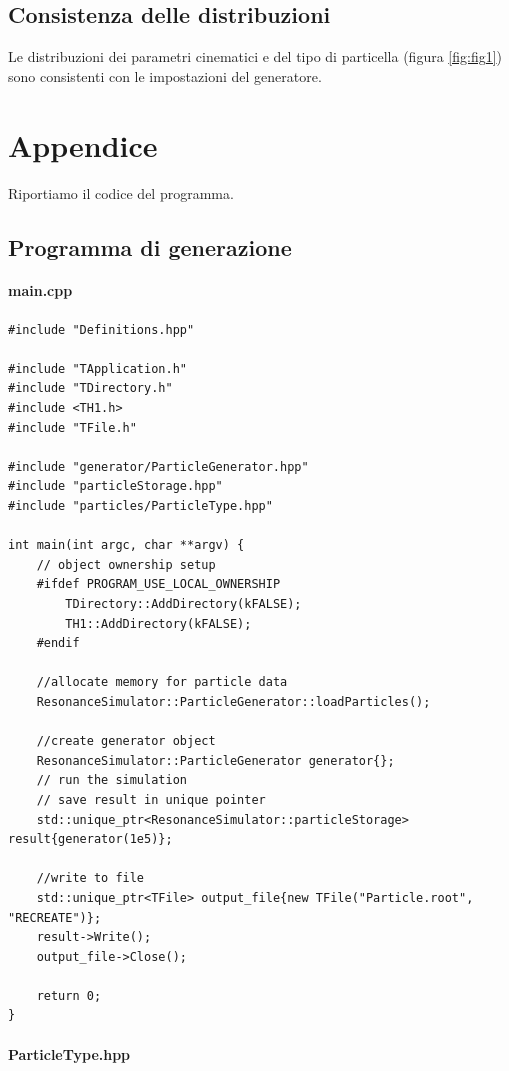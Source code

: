 \documentclass[12pt, a4paper]{article}
\begin{document}
\subsection{Consistenza delle distribuzioni}
Le distribuzioni dei parametri cinematici e del tipo di particella (figura \ref{fig:fig1}) sono consistenti con le impostazioni del generatore.


\section{Appendice}

Riportiamo il codice del programma.

\subsection{Programma di generazione}

\paragraph{main.cpp}

\begin{verbatim}
#include "Definitions.hpp"

#include "TApplication.h"
#include "TDirectory.h"
#include <TH1.h>
#include "TFile.h"

#include "generator/ParticleGenerator.hpp"
#include "particleStorage.hpp"
#include "particles/ParticleType.hpp"

int main(int argc, char **argv) {
    // object ownership setup
    #ifdef PROGRAM_USE_LOCAL_OWNERSHIP
        TDirectory::AddDirectory(kFALSE);
        TH1::AddDirectory(kFALSE);
    #endif

    //allocate memory for particle data
    ResonanceSimulator::ParticleGenerator::loadParticles();

    //create generator object
    ResonanceSimulator::ParticleGenerator generator{};
    // run the simulation
    // save result in unique pointer
    std::unique_ptr<ResonanceSimulator::particleStorage> result{generator(1e5)};

    //write to file
    std::unique_ptr<TFile> output_file{new TFile("Particle.root", "RECREATE")};
    result->Write();
    output_file->Close();

    return 0;
}
\end{verbatim}

\paragraph{ParticleType.hpp}
\end{document}
